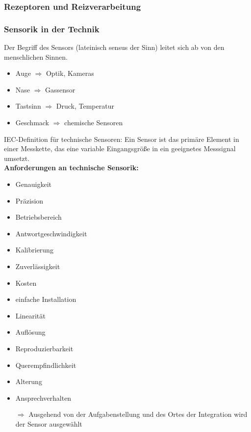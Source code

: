 \subsubsection{Rezeptoren und Reizverarbeitung}
\subsubsection{Sensorik in der Technik}
Der Begriff des Sensors (lateinisch \glqq sensus\grqq{} der Sinn) leitet sich ab von den menschlichen Sinnen.
\begin{itemize}
\setlength\itemsep{0em}
\item Auge $\Rightarrow$ Optik, Kameras
\item Nase $\Rightarrow$ Gassensor
\item Tastsinn $\Rightarrow$ Druck, Temperatur
\item Geschmack $\Rightarrow$ chemische Sensoren
\end{itemize}
IEC-Definition für technische Sensoren:
\glqq Ein Sensor ist das primäre Element in einer Messkette, das eine variable Eingangsgröße in ein geeignetes Messsignal umsetzt.\grqq \\
\textbf{Anforderungen an technische Sensorik:}
\begin{itemize}
\setlength\itemsep{0em}
\item Genauigkeit 
\item Präzision 
\item Betriebsbereich 
\item Antwortgeschwindigkeit 
\item Kalibrierung 
\item Zuverlässigkeit 
\item Kosten
\item einfache Installation
\item Linearität
\item Auflösung
\item Reproduzierbarkeit
\item Querempfindlichkeit
\item Alterung
\item Ansprechverhalten
\item[$\Rightarrow$] Ausgehend von der Aufgabenstellung und des Ortes der Integration wird der Sensor ausgewählt
\end{itemize}

